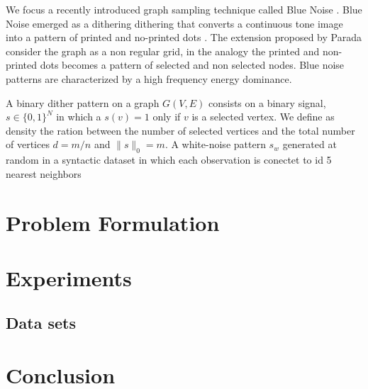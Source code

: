 \documentclass[12 pt]{IEEEtran}
\begin{document}
We focus a recently introduced graph sampling technique called Blue Noise \cite{parada2018blue}. Blue Noise emerged as a dithering dithering 
 that converts a continuous tone image into a pattern
of printed and no-printed dots \cite{ulichney1988dithering,lau2003blue}. The extension proposed by Parada consider the graph as a non regular grid, in the analogy the printed and non-printed dots becomes a pattern of selected and non selected nodes. Blue noise patterns are characterized by a high frequency energy dominance.

A binary dither pattern on  a graph $G(V,E)$ consists on a binary signal, $s \in \{0,1\}^{N}$ in which a $s(v)=1$ only  if $v$ is a selected  vertex. We define as density the ration between the number of selected vertices and the total number of vertices $d=m/n$ and $\parallel s \parallel_{0}=m$. A white-noise pattern $s_{w}$ generated at random in a syntactic dataset in which each observation is conectet to id 5 nearest neighbors  









\section{Problem Formulation}



\section{Experiments}

\subsection{Data sets}



\section{Conclusion}


\end{document}
